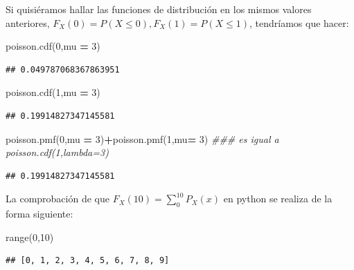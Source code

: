 \documentclass[]{book}
\newenvironment{Shaded}{\begin{snugshade}}{\end{snugshade}}
\newcommand{\BuiltInTok}[1]{#1}
\newcommand{\CommentTok}[1]{\textcolor[rgb]{0.56,0.35,0.01}{\textit{#1}}}
\newcommand{\DecValTok}[1]{\textcolor[rgb]{0.00,0.00,0.81}{#1}}
\newcommand{\NormalTok}[1]{#1}
\newcommand{\OperatorTok}[1]{\textcolor[rgb]{0.81,0.36,0.00}{\textbf{#1}}}
\begin{document}
Si quisiéramos hallar las funciones de distribución en los mismos valores anteriores,
\(F_X(0)=P(X\leq 0), F_X(1)=P(X\leq 1)\), tendríamos que hacer:

\begin{Shaded}
\begin{Highlighting}[]
\NormalTok{poisson.cdf(}\DecValTok{0}\NormalTok{,mu }\OperatorTok{=} \DecValTok{3}\NormalTok{)}
\end{Highlighting}
\end{Shaded}

\begin{verbatim}
## 0.049787068367863951
\end{verbatim}

\begin{Shaded}
\begin{Highlighting}[]
\NormalTok{poisson.cdf(}\DecValTok{1}\NormalTok{,mu }\OperatorTok{=} \DecValTok{3}\NormalTok{)}
\end{Highlighting}
\end{Shaded}

\begin{verbatim}
## 0.19914827347145581
\end{verbatim}

\begin{Shaded}
\begin{Highlighting}[]
\NormalTok{poisson.pmf(}\DecValTok{0}\NormalTok{,mu }\OperatorTok{=} \DecValTok{3}\NormalTok{)}\OperatorTok{+}\NormalTok{poisson.pmf(}\DecValTok{1}\NormalTok{,mu}\OperatorTok{=} \DecValTok{3}\NormalTok{) }\CommentTok{### es igual a poisson.cdf(1,lambda=3)}
\end{Highlighting}
\end{Shaded}

\begin{verbatim}
## 0.19914827347145581
\end{verbatim}

La comprobación de que \(F_X(10)=\displaystyle\sum_{0}^{10} P_X(x)\) en python se realiza de la forma siguiente:

\begin{Shaded}
\begin{Highlighting}[]
\BuiltInTok{range}\NormalTok{(}\DecValTok{0}\NormalTok{,}\DecValTok{10}\NormalTok{)}
\end{Highlighting}
\end{Shaded}

\begin{verbatim}
## [0, 1, 2, 3, 4, 5, 6, 7, 8, 9]
\end{verbatim}
\end{document}
